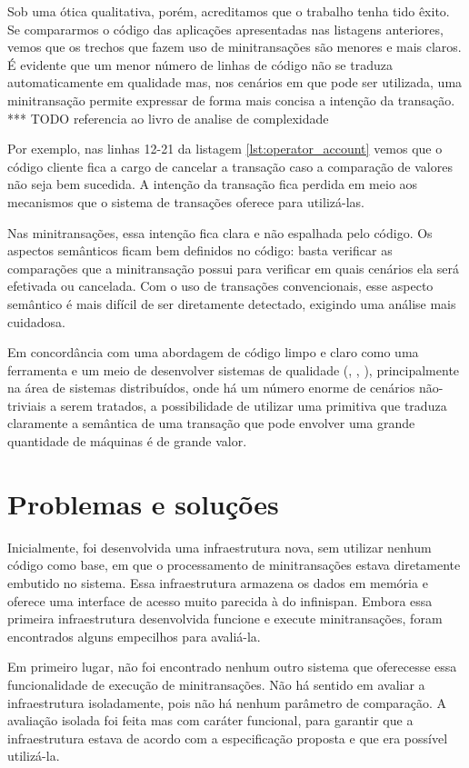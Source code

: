 \documentclass[11pt,twoside,a4paper]{book}
\begin{document}
Sob uma ótica qualitativa, porém, acreditamos que o trabalho tenha tido êxito. Se compararmos o código das aplicações apresentadas nas listagens anteriores, vemos que os trechos que fazem uso de minitransações são menores e mais claros. É evidente que um menor número de linhas de código não se traduza automaticamente em qualidade mas, nos cenários em que pode ser utilizada, uma minitransação permite expressar de forma mais concisa a intenção da transação. *** TODO referencia ao livro de analise de complexidade

Por exemplo, nas linhas 12-21 da listagem \ref{lst:operator_account} vemos que o código cliente fica a cargo de cancelar a transação caso a comparação de valores não seja bem sucedida. A intenção da transação fica perdida em meio aos mecanismos que o sistema de transações oferece para utilizá-las. 

Nas minitransações, essa intenção fica clara e não espalhada pelo código. Os aspectos semânticos ficam bem definidos no código: basta verificar as comparações que a minitransação possui para verificar em quais cenários ela será efetivada ou cancelada. Com o uso de transações convencionais, esse aspecto semântico é mais difícil de ser diretamente detectado, exigindo uma análise mais cuidadosa.

Em concordância com uma abordagem de código limpo e claro como uma ferramenta e um meio de desenvolver sistemas de qualidade (\cite{clean_code}, \cite{xp}, \cite{refactoring}), principalmente na área de sistemas distribuídos, onde há um número enorme de cenários não-triviais a serem tratados, a possibilidade de utilizar uma primitiva que traduza claramente a semântica de uma transação que pode envolver uma grande quantidade de máquinas é de grande valor.

\section{Problemas e soluções}
\label{sec:problemas_solucoes}

Inicialmente, foi desenvolvida uma infraestrutura nova, sem utilizar nenhum código como base, em que o processamento de minitransações estava diretamente embutido no sistema. Essa infraestrutura armazena os dados em memória e oferece uma interface de acesso muito parecida à do infinispan. Embora essa primeira infraestrutura desenvolvida funcione e execute minitransações, foram encontrados alguns empecilhos para avaliá-la.

Em primeiro lugar, não foi encontrado nenhum outro sistema que oferecesse essa funcionalidade de execução de minitransações. Não há sentido em avaliar a infraestrutura isoladamente, pois não há nenhum parâmetro de comparação. A avaliação isolada foi feita mas com caráter funcional, para garantir que a infraestrutura estava de acordo com a especificação proposta e que era possível utilizá-la.
\end{document}
